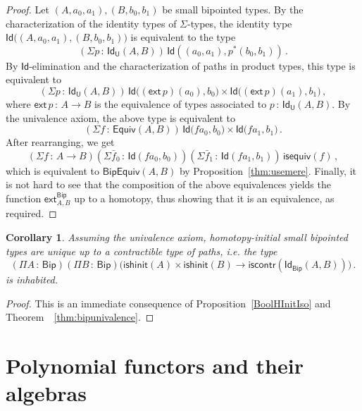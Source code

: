 \documentclass[10pt,a4paper,oneside,reqno]{amsart}
\numberwithin{equation}{section}
\theoremstyle{mythm}
\newtheorem{corollary}[theorem]{Corollary}
\theoremstyle{mydef}
\theoremstyle{myrmk}
\newcommand{\co}{\,{:}\,}
\newcommand{\iscontr}{\mathsf{iscontr}}
\newcommand{\isequiv}{\mathsf{isequiv}}
\newcommand{\isbiphinit}{\mathsf{ishinit}}
\newcommand{\Eq}{\mathsf{Equiv}}
\newcommand{\ext}{\mathsf{ext}}
\newcommand{\Id}{\mathsf{Id}}
\newcommand{\U}{\mathsf{U}}
\newcommand{\Bip}{\mathsf{Bip}}
\newcommand{\BipEquiv}{\mathsf{BipEquiv}}
\begin{document}
\begin{proof} 
Let $ (A,a_0,a_1), (B,b_0,b_1)$ be small bipointed types. By the characterization of the identity types
of $\Sigma$-types, the 
identity type $\Id\big( (A,a_0,a_1),  (B,b_0,b_1)\big)$ is equivalent to  the type
\[
(\Sigma p \co \Id_\U(A,B))  \, \Id(( a_0,a_1 ),  p^* ( b_0,b_1))  \, .
\]
By $\Id$-elimination and the characterization of paths in product types, this type is equivalent to
\[ 
(\Sigma p \co \Id_\U(A,B)) \, \Id \big( (\ext \, p)(a_0),  b_0\big) \times \Id \big( (\ext \, p)(a_1) , b_1) \, ,
 \]
where $\ext \, p \co A \to B$ is the equivalence of types associated to $p \co \Id_\U(A,B)$.  By the univalence axiom,
the above type is equivalent to
\[ 
(\Sigma f \co \Eq(A,B)) \, \Id \big( f a_0 ,  b_0\big) \times \Id \big( f a_1 , b_1\big)  \, .
\]
After rearranging, we get
\[
(\Sigma f  \co A \to B)(\Sigma \bar{f}_0 \co \Id( fa_0, b_0)) (\Sigma \bar{f}_1 \co \Id( fa_1, b_1))  \, \isequiv(f) \, ,
\]
which is equivalent to $\BipEquiv(A,B)$ by Proposition~\ref{thm:usemere}. Finally, it is not hard to see that the composition of the above equivalences yields the  function $\ext^{\Bip}_{A,B}$ up to a homotopy, thus showing that it is an equivalence, as required.
\end{proof} 




\begin{corollary} 
Assuming the univalence axiom, 
homotopy-initial small bipointed types are unique up to a contractible type of paths, i.e. the type
\[ 
(\Pi A \co \Bip) (\Pi B \co \Bip)
\big( \isbiphinit(A) \times \isbiphinit(B) \to \iscontr(\Id_\Bip(A,B)) \big) \, .
\] 
is inhabited.
\end{corollary}

\begin{proof} This is an immediate consequence of Proposition~\ref{BoolHInitIso} and 
Theorem~~\ref{thm:bipunivalence}. 
\end{proof} 



% 

\section{Polynomial functors and their algebras}
\label{section:wfiles}
\end{document}
